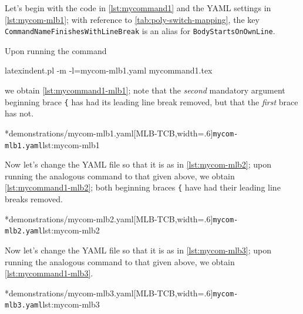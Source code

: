 	Let's begin with the code in \cref{lst:mycommand1} and the YAML settings in
	\cref{lst:mycom-mlb1}; with reference to \vref{tab:poly-switch-mapping}, the key
	\texttt{CommandNameFinishesWithLineBreak} is an alias for \texttt{BodyStartsOnOwnLine}.


	Upon running the command
	\begin{commandshell}
latexindent.pl -m -l=mycom-mlb1.yaml mycommand1.tex
\end{commandshell}
	we obtain \cref{lst:mycommand1-mlb1}; note that the \emph{second} mandatory argument
	beginning brace \lstinline!{! has had its leading line break removed, but that the
	\emph{first} brace has not.

	\begin{cmhtcbraster}[
			raster force size=false,
			raster column 1/.style={add to width=-1cm},
		]
		\cmhlistingsfromfile[style=yaml-LST]*{demonstrations/mycom-mlb1.yaml}[MLB-TCB,width=.6\textwidth]{\texttt{mycom-mlb1.yaml}}{lst:mycom-mlb1}
	\end{cmhtcbraster}

	Now let's change the YAML file so that it is as in \cref{lst:mycom-mlb2}; upon running
	the analogous command to that given above, we obtain \cref{lst:mycommand1-mlb2}; both
	beginning braces \lstinline!{! have had their leading line breaks removed.

	\begin{cmhtcbraster}[
			raster force size=false,
			raster column 1/.style={add to width=-1cm},
		]
		\cmhlistingsfromfile[style=yaml-LST]*{demonstrations/mycom-mlb2.yaml}[MLB-TCB,width=.6\textwidth]{\texttt{mycom-mlb2.yaml}}{lst:mycom-mlb2}
	\end{cmhtcbraster}

	Now let's change the YAML file so that it is as in \cref{lst:mycom-mlb3}; upon running
	the analogous command to that given above, we obtain \cref{lst:mycommand1-mlb3}.

	\begin{cmhtcbraster}[
			raster force size=false,
			raster column 1/.style={add to width=-1cm},
		]
		\cmhlistingsfromfile[style=yaml-LST]*{demonstrations/mycom-mlb3.yaml}[MLB-TCB,width=.6\textwidth]{\texttt{mycom-mlb3.yaml}}{lst:mycom-mlb3}
	\end{cmhtcbraster}

